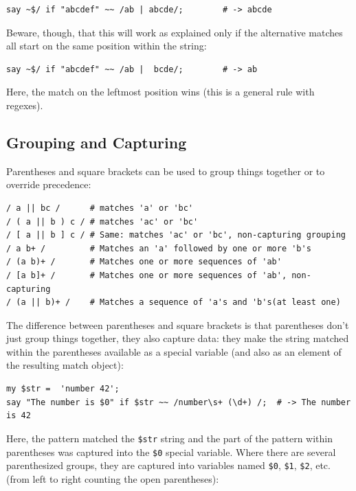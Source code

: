 \begin{verbatim}
say ~$/ if "abcdef" ~~ /ab | abcde/;        # -> abcde
\end{verbatim}
%

Beware, though, that this will work as explained only if 
the alternative matches all start on the same position 
within the string:

\begin{verbatim}
say ~$/ if "abcdef" ~~ /ab |  bcde/;        # -> ab
\end{verbatim}
%

Here, the match on the leftmost position wins (this is 
a general rule with regexes).


\subsection{Grouping and Capturing}

Parentheses and square brackets can be used to group 
things together or to override precedence:

\begin{verbatim}
/ a || bc /      # matches 'a' or 'bc'
/ ( a || b ) c / # matches 'ac' or 'bc'
/ [ a || b ] c / # Same: matches 'ac' or 'bc', non-capturing grouping
/ a b+ /         # Matches an 'a' followed by one or more 'b's
/ (a b)+ /       # Matches one or more sequences of 'ab'
/ [a b]+ /       # Matches one or more sequences of 'ab', non-capturing
/ (a || b)+ /    # Matches a sequence of 'a's and 'b's(at least one)
\end{verbatim}
%

The difference between parentheses and square brackets is 
that parentheses don't just group things together, 
they also capture data: they make the string matched within 
the parentheses available as a special variable (and also 
as an element of the resulting match object):

\begin{verbatim}
my $str =  'number 42';
say "The number is $0" if $str ~~ /number\s+ (\d+) /;  # -> The number is 42
\end{verbatim}
%

Here, the pattern matched the \verb'$str' string and the 
part of the pattern within parentheses was captured into 
the \verb'$0' special variable. Where there are several 
parenthesized groups, they are captured into variables 
named \verb'$0', \verb'$1',  \verb'$2', etc. (from 
left to right counting the open parentheses):

